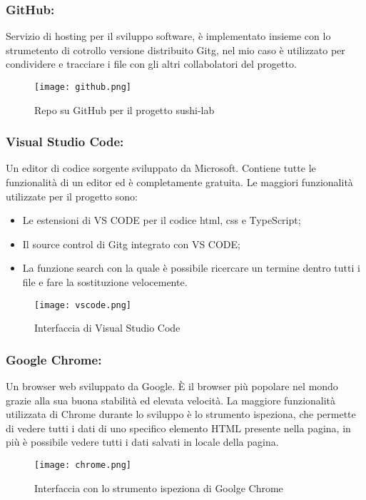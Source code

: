 \subsubsection{GitHub:}
Servizio di hosting per il sviluppo software, è implementato insieme con lo strumetento di cotrollo versione distribuito \gls{Gitg}, nel mio caso è utilizzato per condividere e tracciare i file con gli altri collabolatori del progetto.
\begin{figure}[H]
    \centering
    \texttt{[image: github.png]}
    \caption{Repo su GitHub per il progetto sushi-lab}
\end{figure}
\subsubsection{Visual Studio Code:}
Un editor di codice sorgente sviluppato da Microsoft. Contiene tutte le funzionalità di un editor ed è completamente gratuita. Le maggiori funzionalità utilizzate per il progetto sono:
\begin{itemize}
    \item Le estensioni di VS CODE per il codice html, css e TypeScript;
    \item Il source control di \gls{Gitg} integrato con VS CODE;
    \item La funzione search con la quale è possibile ricercare un termine dentro tutti i file e fare la sostituzione velocemente.
\end{itemize}
\begin{figure}[H]
    \centering
    \texttt{[image: vscode.png]}
    \caption{Interfaccia di Visual Studio Code}
\end{figure}
\subsubsection{Google Chrome:}
Un browser web sviluppato da Google. È il browser più popolare nel mondo grazie alla sua buona stabilità ed elevata velocità. La maggiore funzionalità utilizzata di Chrome durante lo sviluppo è lo strumento ispeziona, che permette di vedere tutti i dati di uno specifico elemento HTML presente nella pagina, in più è possibile vedere tutti i dati salvati in locale della pagina.
\begin{figure}[H]
    \centering
    \texttt{[image: chrome.png]}
    \caption{Interfaccia con lo strumento ispeziona di Goolge Chrome}
\end{figure}
    
